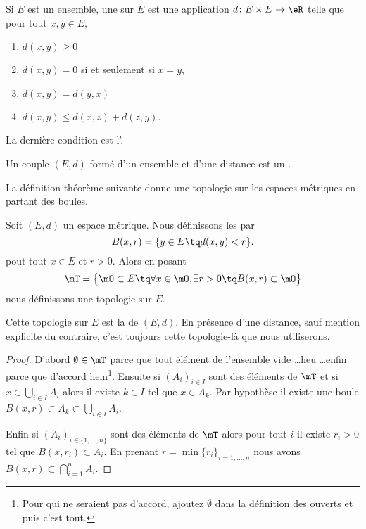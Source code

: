 \begin{definition}  \label{DefMVNVFsX}
    Si $E$ est un ensemble, une  sur $E$ est une application $d\colon E\times E\to \eR$ telle que pour tout $x,y\in E$,
    \begin{enumerate}

    \item
    $d(x,y)\geq 0$

    \item
    $d(x,y)=0$ si et seulement si $x=y$,

    \item
    $d(x,y)=d(y,x)$

    \item
    $d(x,y)\leq d(x,z)+d(z,y)$.

    \end{enumerate}
    La dernière condition est l'.

    Un couple $(E,d)$ formé d'un ensemble et d'une distance est un .
\end{definition}

La définition-théorème suivante donne une topologie sur les espaces métriques en partant des boules.

\begin{theoremDef}     \label{ThoORdLYUu}
    Soit \( (E,d)\) un espace métrique. Nous définissons les  par
    \begin{equation}        \label{EQooYCWSooIhibvd}
        B(x,r)=\{ y\in E\tq d(x,y)<r \}.
    \end{equation}
    pout tout \( x\in E\) et \( r>0\).
    Alors en posant
    \begin{equation}        \label{EqGDVVooDZfwSf}
        \mT=\big\{  \mO\subset E  \tq\forall x\in \mO,\exists r>0\tq B(x,r)\subset \mO \big\}
    \end{equation}
    nous définissons une topologie sur \( E\).

    Cette topologie sur \( E\) est la  de \( (E,d)\). En présence d'une distance, sauf mention explicite du contraire, c'est toujours cette topologie-là que nous utiliserons.
\end{theoremDef}

\begin{proof}
    D'abord \( \emptyset\in\mT\) parce que tout élément de l'ensemble vide \ldots heu \ldots enfin parce que d'accord hein\footnote{Pour qui ne seraient pas d'accord, ajoutez \( \emptyset\) dans la définition des ouverts et puis c'est tout.}. Ensuite si \( (A_i)_{i\in I}\) sont des éléments de \( \mT\) et si \( x\in\bigcup_{i\in I}A_i\) alors il existe \( k\in I\) tel que \( x\in A_k\). Par hypothèse il existe une boule \( B(x,r)\subset A_k\subset\bigcup_{i\in I}A_i\).

    Enfin si \( (A_i)_{i\in\{ 1,\ldots, n \}}\) sont des éléments de \( \mT\) alors pour tout \( i\) il existe \( r_i>0\) tel que \( B(x,r_i)\subset A_i\). En prenant \( r=\min\{ r_i \}_{i=1,\ldots, n}\) nous avons $B(x,r)\subset\bigcap_{i=1}^nA_i.$
\end{proof}

